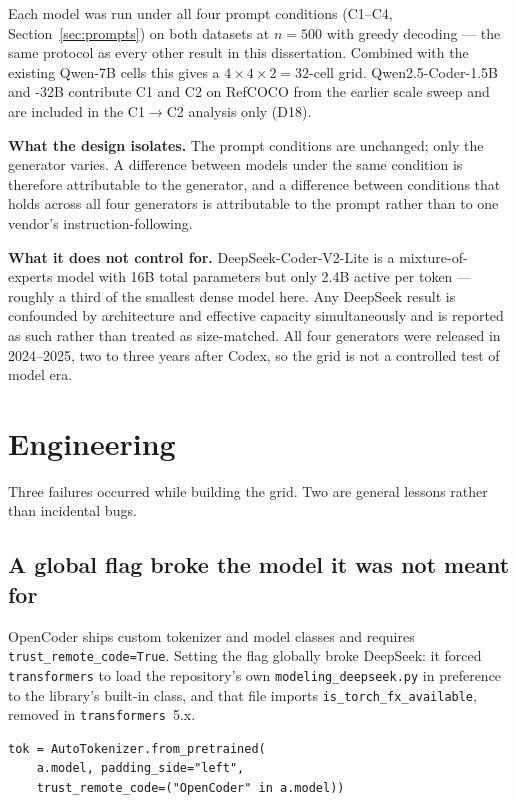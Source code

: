 Each model was run under all four prompt conditions (C1--C4,
Section~\ref{sec:prompts}) on both datasets at $n=500$ with greedy decoding --- the
same protocol as every other result in this dissertation. Combined with the existing
Qwen-7B cells this gives a $4 \times 4 \times 2 = 32$-cell grid. Qwen2.5-Coder-1.5B
and -32B contribute C1 and C2 on RefCOCO from the earlier scale sweep and are
included in the C1$\to$C2 analysis only (D18).

\textbf{What the design isolates.} The prompt conditions are unchanged; only the
generator varies. A difference between models under the same condition is therefore
attributable to the generator, and a difference between conditions that holds across
all four generators is attributable to the prompt rather than to one vendor's
instruction-following.

\textbf{What it does not control for.} DeepSeek-Coder-V2-Lite is a mixture-of-experts
model with 16B total parameters but only 2.4B active per token --- roughly a third of
the smallest dense model here. Any DeepSeek result is confounded by architecture and
effective capacity simultaneously and is reported as such rather than treated as
size-matched. All four generators were released in 2024--2025, two to three years
after Codex, so the grid is not a controlled test of model era.

\section{Engineering}

Three failures occurred while building the grid. Two are general lessons rather than
incidental bugs.

\subsection{A global flag broke the model it was not meant for}

OpenCoder ships custom tokenizer and model classes and requires
\texttt{trust\_remote\_code=True}. Setting the flag globally broke DeepSeek: it forced
\texttt{transformers} to load the repository's own \texttt{modeling\_deepseek.py} in
preference to the library's built-in class, and that file imports
\texttt{is\_torch\_fx\_available}, removed in \texttt{transformers}~5.x.

\begin{lstlisting}[caption={The flag is made conditional on the model identifier
rather than applied uniformly (D15).}]
tok = AutoTokenizer.from_pretrained(
    a.model, padding_side="left",
    trust_remote_code=("OpenCoder" in a.model))
\end{lstlisting}

